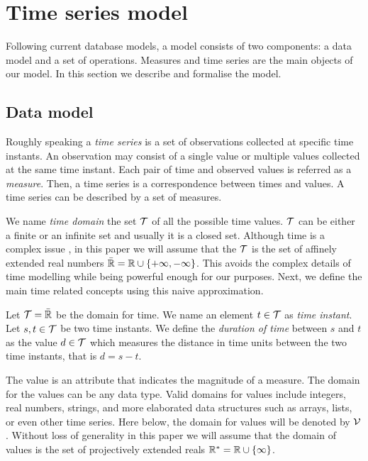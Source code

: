 
\section{Time series model}
\label{sec:model:TSMS}

Following current database models, a  model consists of two
components: a data model and a set of operations. Measures and time
series are the main objects of our  model. 
%
In this section we describe and formalise the  model. 


\subsection{Data model}

Roughly speaking a \emph{time series} is a set of observations
collected at specific time instants. An observation may consist of a
single value or multiple values collected at the same time instant.
Each pair of time and observed values is referred as a
\emph{measure}. Then, a time series is a correspondence between times
and values. A time series can be described by a set of measures.

We name \emph{time domain} the set $\cal{T}$ of all the possible time
values. $\cal{T}$ can be either a finite or an infinite set and
usually it is a closed set. Although time is a complex issue
\cite{iep:time-supplement}, in this paper we will assume that the
$\cal{T}$ is the set of affinely extended real numbers $\bar{\mathbb{R}} = \mathbb{R} \cup
\{+\infty,-\infty\}$. This avoids the complex details of time
modelling while being powerful enough for our purposes. Next, we
define the main time related concepts using this naive approximation.



\begin{definition}
  \label{def:model:temps}
  Let $\cal{T}=\bar{\mathbb{R}}$ be the domain for time.
  We name an element $t\in\cal{T}$ as \emph{time instant}.
  Let $s,t\in\cal{T}$ be two time instants.  We define the
  \emph{duration of time} between $s$ and $t$ as the value $d
  \in\cal{T}$ which measures the distance in time units between the
  two time instants, that is $d =s-t$.
\end{definition}

The value is an attribute that indicates the magnitude of a
measure. The domain for the values can be any data type. Valid domains
for values include integers, real numbers, strings, and more
elaborated data structures such as arrays, lists, or even other time
series. Here below, the domain for values will be denoted by
$\cal{V}$. 
%
Without loss of generality in this paper we will assume that the
domain of values is the set of projectively extended reals $\mathbb{R}^{*} = \mathbb{R}
\cup \{\infty\}$.

